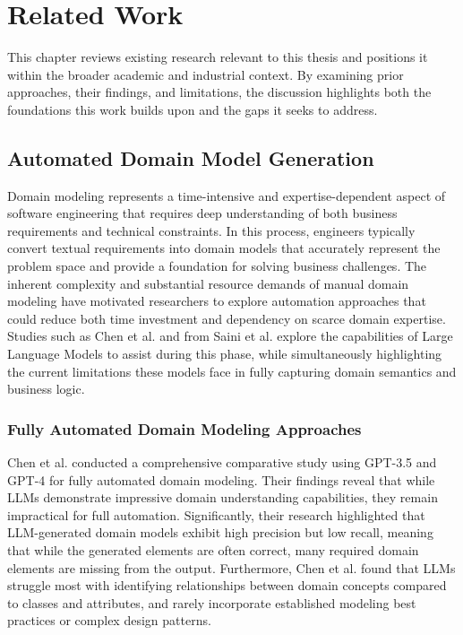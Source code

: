 \chapter{Related Work}\label{chapter:relatedwork}
This chapter reviews existing research relevant to this thesis and positions it within the broader academic and industrial context. By examining prior approaches, their findings, and limitations, the discussion highlights both the foundations this work builds upon and the gaps it seeks to address.

\section{Automated Domain Model Generation}\label{admg}
Domain modeling represents a time-intensive and expertise-dependent aspect of software engineering that requires deep understanding of both business requirements and technical constraints. In this process, engineers typically convert textual requirements into domain models that accurately represent the problem space and provide a foundation for solving business challenges. The inherent complexity and substantial resource demands of manual domain modeling have motivated researchers to explore automation approaches that could reduce both time investment and dependency on scarce domain expertise. Studies such as Chen et al. \autocite{chen2023automated} and from Saini et al. \autocite{Saini2022} explore the capabilities of Large Language Models to assist during this phase, while simultaneously highlighting the current limitations these models face in fully capturing domain semantics and business logic. 

\subsection{Fully Automated Domain Modeling Approaches}

Chen et al. \autocite{chen2023automated} conducted a comprehensive comparative study using GPT-3.5 and GPT-4 for fully automated domain modeling. Their findings reveal that while LLMs demonstrate impressive domain understanding capabilities, they remain impractical for full automation. Significantly, their research highlighted that LLM-generated domain models exhibit high precision but low recall, meaning that while the generated elements are often correct, many required domain elements are missing from the output. Furthermore, Chen et al. found that LLMs struggle most with identifying relationships between domain concepts compared to classes and attributes, and rarely incorporate established modeling best practices or complex design patterns.

